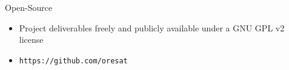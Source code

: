 \documentclass[slidestop,compress]{beamer}
\begin{document}
\begin{frame}[plain]
\begin{block}{\centering Open-Source}
\hspace{1 mm}
\begin{itemize}
\item Project deliverables freely and publicly available under a GNU GPL v2 license
\item \texttt{https://github.com/oresat}
\\


\end{itemize}
\end{block}    
\end{frame}
\end{document}
